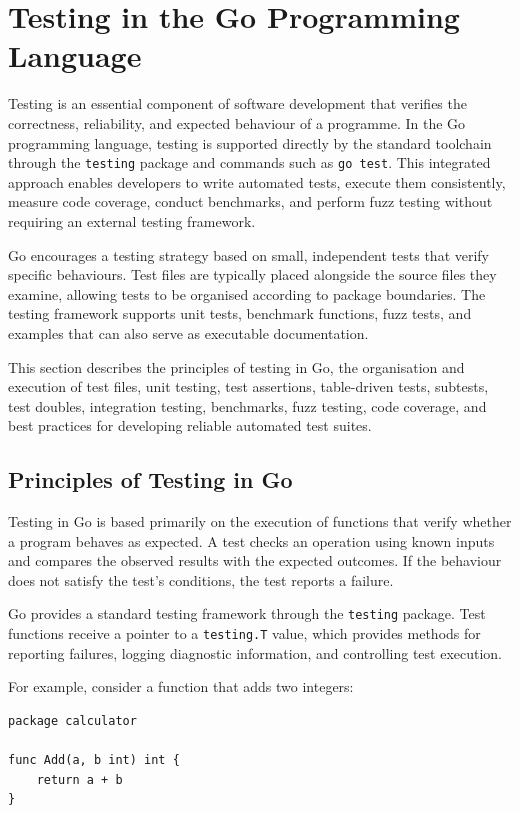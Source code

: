 \section{Testing in the Go Programming Language}

Testing is an essential component of software development that verifies the correctness, reliability, and expected behaviour of a programme. In the Go programming language, testing is supported directly by the standard toolchain through the \texttt{testing} package and commands such as \texttt{go test}. This integrated approach enables developers to write automated tests, execute them consistently, measure code coverage, conduct benchmarks, and perform fuzz testing without requiring an external testing framework.

Go encourages a testing strategy based on small, independent tests that verify specific behaviours. Test files are typically placed alongside the source files they examine, allowing tests to be organised according to package boundaries. The testing framework supports unit tests, benchmark functions, fuzz tests, and examples that can also serve as executable documentation.

This section describes the principles of testing in Go, the organisation and execution of test files, unit testing, test assertions, table-driven tests, subtests, test doubles, integration testing, benchmarks, fuzz testing, code coverage, and best practices for developing reliable automated test suites.

\subsection{Principles of Testing in Go}

Testing in Go is based primarily on the execution of functions that verify whether a program behaves as expected. A test checks an operation using known inputs and compares the observed results with the expected outcomes. If the behaviour does not satisfy the test's conditions, the test reports a failure.

Go provides a standard testing framework through the \texttt{testing} package. Test functions receive a pointer to a \texttt{testing.T} value, which provides methods for reporting failures, logging diagnostic information, and controlling test execution.

For example, consider a function that adds two integers:

\begin{lstlisting}
package calculator

func Add(a, b int) int {
    return a + b
}
\end{lstlisting}

